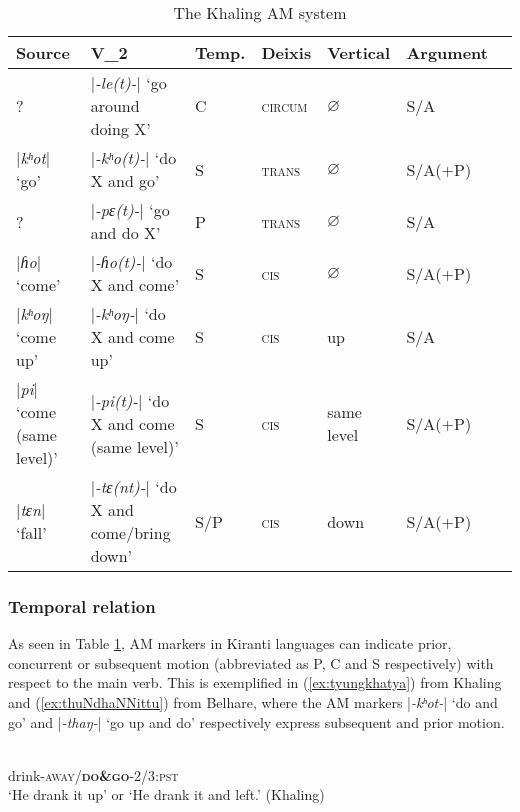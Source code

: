 \documentclass[oneside,a4paper,11pt]{article}
\newcommand{\ipa}[1]{{\phon\textit{#1}}}
\newcommand{\rouge}[1]{\textbf{#1}}
\newcommand{\dhatu}[2]{|\ipa{#1}| `#2'}
\begin{document}
\begin{landscape}
\begin{table}%
\caption{The Khaling AM system} \label{tab:system} \centering
\begin{tabular}{lllllll}
\toprule
Source &V_2 & Temp.& Deixis & Vertical  & Argument \\
\midrule
?& \dhatu{-le(t)-}{go around doing X} &C& \textsc{circum} & $\varnothing$ & S/A \\
\dhatu{kʰot}{go} &\dhatu{-kʰo(t)-}{do X and go} &S& \textsc{trans} & $\varnothing$ &  S/A(+P) \\
?&\dhatu{-pɛ(t)-}{go and do X} &P& \textsc{trans} & $\varnothing$ & S/A \\
\dhatu{ɦo}{come} &\dhatu{-ɦo(t)-}{do X and come} &S& \textsc{cis} & $\varnothing$ & S/A(+P) \\
\dhatu{kʰoŋ}{come up}&\dhatu{-kʰoŋ-}{do X and come up} &S& \textsc{cis} &up & S/A \\
 \dhatu{pi}{come (same level)}&\dhatu{-pi(t)-}{do X and come (same level)} &S& \textsc{cis} &same level & S/A(+P) \\
\dhatu{tɛn}{fall} & \dhatu{-tɛ(nt)-}{do X and come/bring down} &S/P & \textsc{cis} &down & S/A(+P) \\
\bottomrule
\end{tabular}
\end{table}
\end{landscape}

 \subsubsection{Temporal relation} \label{sec:temporal.khaling}
As seen in Table \ref{tab:system}, AM markers in Kiranti languages can indicate prior, concurrent or subsequent motion (abbreviated as P, C and S respectively) with respect to the main verb.  This is exemplified in (\ref{ex:tyungkhatya}) from Khaling and (\ref{ex:thuNdhaNNittu}) from Belhare, where the AM markers \dhatu{-kʰot-}{do and go} and  \dhatu{-thaŋ-}{go up and do} respectively express subsequent and prior motion.

\begin{exe}
\ex \label{ex:tyungkhatya}
 \gll   \ipa{tʉ̂ŋ-\rouge{kʰʌ}-tɛ} \\
 drink-\textsc{away/\rouge{do\&go}}-\textsc{2/3:pst} \\
 \glt `He drank it up' or `He drank it and left.'  (Khaling)
 \end{exe}
 
\end{document}
